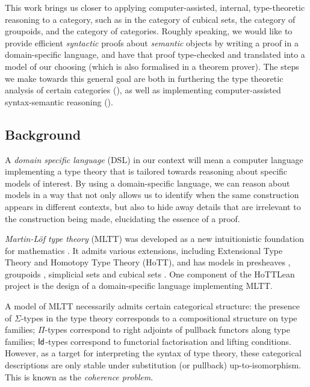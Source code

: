 This work brings us closer to applying computer-assisted, internal,
type-theoretic reasoning to a category,
such as in the category of cubical sets,
the category of groupoids, and the category of categories.
Roughly speaking, we would like to
provide efficient \emph{syntactic} proofs about \emph{semantic} objects
by writing a proof in a {domain-specific language},
and have that proof type-checked and translated
into a model of our choosing (which is also formalised in a theorem prover).
The steps we make towards this general goal are both in 
furthering the type theoretic analysis of certain categories
(),
as well as implementing computer-assisted
syntax-semantic reasoning ().

\subsection*{Background}

A \emph{domain specific language} (DSL) in our context
will mean a computer language implementing a type theory that is
tailored towards reasoning about specific models of interest.
By using a domain-specific language,
we can reason about models in a way that not only allows us to identify
when the same construction appears in different contexts,
but also to hide away details that are irrelevant to the construction being made,
elucidating the essence of a proof.

\emph{Martin-L\"of type theory} (MLTT) was developed
as a new intuitionistic foundation for mathematics \cite{martin1975,martin1998}.
It admits various extensions,
including Extensional Type Theory and Homotopy Type Theory (HoTT),
and has models in presheaves \cite{hofmann1997, awodey2024},
groupoids \cite{hofmann1995},
simplicial sets \cite{kapulkin2021} and cubical sets
\cite{bezem2014, cohen2015, awodey2026cartesian}.
One component of the HoTTLean project \cite{hua2025}
is the design of a domain-specific language implementing MLTT.

A model of MLTT necessarily admits certain categorical structure:
the presence of $\Sigma$-types in the type theory 
corresponds to a compositional structure on type families;
$\Pi$-types correspond to right adjoints of pullback functors along type families;
$\mathsf{Id}$-types correspond to functorial factorisation and lifting conditions.
However, as a target for interpreting the syntax of type theory,
these categorical descriptions are only stable under substitution (or pullback)
up-to-isomorphism.
This is known as the \emph{coherence problem}.

